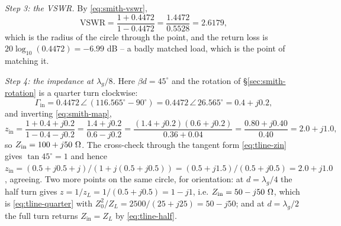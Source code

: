 \emph{Step 3: the VSWR.} By \eqref{eq:smith-vswr},
\begin{equation}
  \mathrm{VSWR} = \frac{1+0.4472}{1-0.4472} = \frac{1.4472}{0.5528} = 2.6179 ,
  \label{eq:smith-ex-vswr}
\end{equation}
which is the radius of the circle through the point, and the return loss is
$20\log_{10}(0.4472)=-6.99$ dB -- a badly matched load, which is the point of matching it.

\emph{Step 4: the impedance at $\lambda_g/8$.} Here $\beta d=45^\circ$ and the rotation of
\S\ref{sec:smith-rotation} is a quarter turn clockwise:
\begin{equation}
  \Gamma_{\mathrm{in}} = 0.4472\,\angle\,(116.565^\circ-90^\circ) = 0.4472\,\angle\,26.565^\circ
                      = 0.4+j0.2 ,
  \label{eq:smith-ex-gin}
\end{equation}
and inverting \eqref{eq:smith-map},
\begin{equation}
  z_{\mathrm{in}} = \frac{1+0.4+j0.2}{1-0.4-j0.2}
                  = \frac{1.4+j0.2}{0.6-j0.2}
                  = \frac{(1.4+j0.2)(0.6+j0.2)}{0.36+0.04}
                  = \frac{0.80+j0.40}{0.40} = 2.0+j1.0 ,
  \label{eq:smith-ex-zin}
\end{equation}
so $Z_{\mathrm{in}}=100+j50\ \Omega$. The cross-check through the tangent form \eqref{eq:tline-zin} gives
$\tan45^\circ=1$ and hence $z_{\mathrm{in}}=(0.5+j0.5+j)/(1+j(0.5+j0.5))=(0.5+j1.5)/(0.5+j0.5)=2.0+j1.0$,
agreeing. Two more points on the same circle, for orientation: at $d=\lambda_g/4$ the half turn gives
$z=1/z_L=1/(0.5+j0.5)=1-j1$, i.e. $Z_{\mathrm{in}}=50-j50\ \Omega$, which is \eqref{eq:tline-quarter} with
$Z_0^2/Z_L=2500/(25+j25)=50-j50$; and at $d=\lambda_g/2$ the full turn returns $Z_{\mathrm{in}}=Z_L$ by
\eqref{eq:tline-half}.

